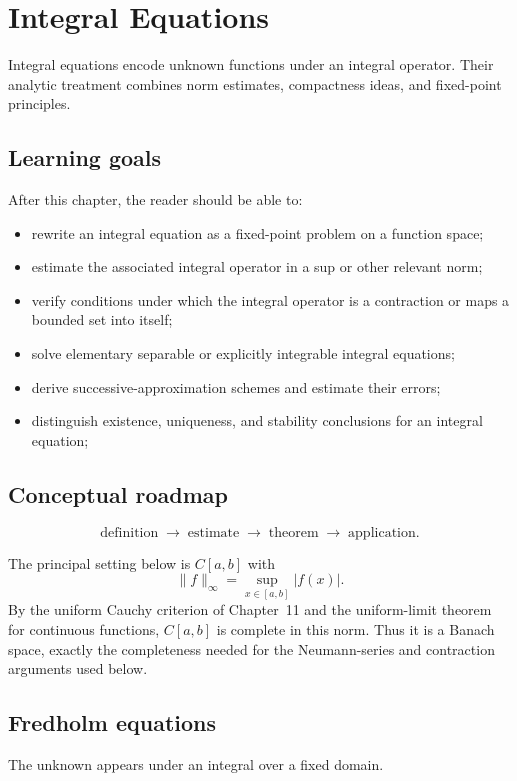 \chapter{Integral Equations}
\label{ch:ii18}

Integral equations encode unknown functions under an integral operator. Their analytic treatment combines norm estimates, compactness ideas, and fixed-point principles.

\section*{Learning goals}
After this chapter, the reader should be able to:
\begin{itemize}
\item rewrite an integral equation as a fixed-point problem on a function space;
\item estimate the associated integral operator in a sup or other relevant norm;
\item verify conditions under which the integral operator is a contraction or maps a bounded set into itself;
\item solve elementary separable or explicitly integrable integral equations;
\item derive successive-approximation schemes and estimate their errors;
\item distinguish existence, uniqueness, and stability conclusions for an integral equation;
\end{itemize}
\section*{Conceptual roadmap}
\[
\boxed{\text{definition}\;\longrightarrow\;\text{estimate}\;\longrightarrow\;\text{theorem}\;\longrightarrow\;\text{application}.}
\]

\begin{remark}
The principal setting below is $C[a,b]$ with
\[
\|f\|_\infty=\sup_{x\in[a,b]}|f(x)|.
\]
By the uniform Cauchy criterion of Chapter~11 and the uniform-limit theorem for continuous functions, $C[a,b]$ is complete in this norm. Thus it is a Banach space, exactly the completeness needed for the Neumann-series and contraction arguments used below.
\end{remark}

\section{Fredholm equations}
The unknown appears under an integral over a fixed domain.

